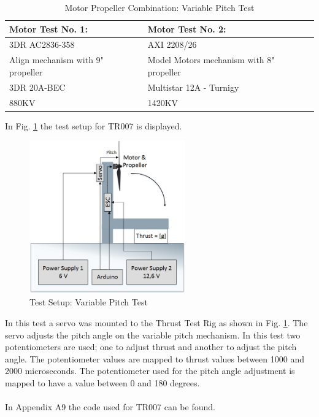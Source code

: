 \begin {table}[H]
    \begin{center}
    \caption {Motor Propeller Combination: Variable Pitch Test} 
    \label{tab:tabt9} 
    \begin{tabular}{|l|l|}\hline 
        Motor Test No. 1: & Motor Test No. 2:  \\ \hline
        3DR AC2836-358  & AXI 2208/26 \\ \hline
        Align mechanism with 9" propeller & Model Motors mechanism with 8" propeller \\ \hline
        3DR 20A-BEC & Multistar 12A - Turnigy \\ \hline
        880KV & 1420KV \\ \hline
        \end{tabular}
    \end{center}
\end{table}
\newpage
\noindent In Fig. \ref{fig:VPM} the test setup for TR007 is displayed.
\begin{figure}[H]
    \centering
    \includegraphics[width = 0.6\textwidth]{VAPIQ-PICTURES/TestSetupGramsPerW}
    \caption{Test Setup: Variable Pitch Test}
    \label{fig:VPM}
\end{figure}
\noindent
In this test a servo was mounted to the Thrust Test Rig as shown in Fig. \ref{fig:VPM}. The servo adjusts the pitch angle on the variable pitch mechanism. In this test two potentiometers are used; one to adjust thrust and another to adjust the pitch angle. The potentiometer values are mapped to thrust values between 1000 and 2000 microseconds. The potentiometer used for the pitch angle adjustment is mapped to have a value between 0 and 180 degrees.\\
\\
In Appendix A9 the code used for TR007 can be found. 


